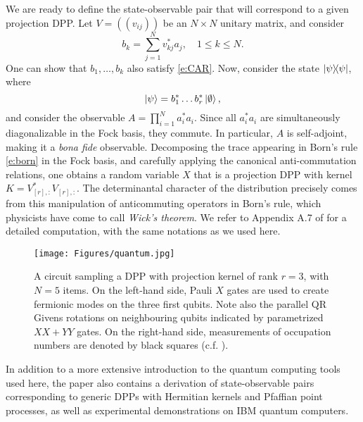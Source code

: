 We are ready to define the state-observable pair that will correspond to a given projection DPP. Let $ V = ((v_{ij}))$ be an $N\times N$ unitary matrix, and consider 
$$
    b_k = \sum_{j=1}^N v_{kj}^* a_j, \quad 1\leq k \leq N.
$$
One can show that $b_1, \dots, b_k$ also satisfy \eqref{e:CAR}. 
Now, consider the state $\ketbra{\psi}$, where
$$
    \ket{\psi} = b_1^* \dots b_r^* \ket{\emptyset},
$$
and consider the observable $A = \prod_{i=1}^N a_i^* a_i$.
Since all $a_i^*a_i$ are simultaneously diagonalizable in the Fock basis, they commute. 
In particular, $A$ is self-adjoint, making it a \emph{bona fide} observable. 
Decomposing the trace appearing in Born's rule \eqref{e:born} in the Fock basis, and carefully applying the canonical anti-commutation relations, one obtains a random variable $X$ that is a projection DPP with kernel $K = V_{[r],:}^*V_{[r],:}$.
The determinantal character of the distribution precisely comes from this manipulation of anticommuting operators in Born's rule, which physicists have come to call \emph{Wick's theorem}.
We refer to Appendix A.7 of \cite{BaFaFe24} for a detailed computation, with the same notations as we used here.


\begin{figure}[h]
    \centering
    \texttt{[image: Figures/quantum.jpg]}
    \caption{A circuit sampling a DPP with projection kernel of rank $r = 3$, with $N = 5$ items. On the left-hand side, Pauli $X$ gates are used to create fermionic modes on the three first qubits. Note also the parallel QR Givens rotations on
neighbouring qubits indicated by parametrized $XX + YY$ gates. On the right-hand side, measurements of occupation numbers are denoted by black squares (c.f. \cite{BaFaFe24}).}
    \label{fig:quantum}
\end{figure}


In addition to a more extensive introduction to the quantum computing tools used here, the paper \cite{BaFaFe24} also contains a derivation of state-observable pairs corresponding to generic DPPs with Hermitian kernels and Pfaffian point processes, as well as experimental demonstrations on IBM quantum computers.
